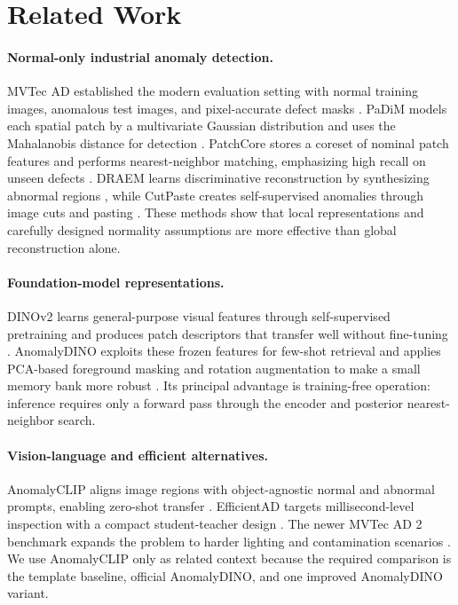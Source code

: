 \section{Related Work}

\paragraph{Normal-only industrial anomaly detection.}
MVTec AD established the modern evaluation setting with normal training
images, anomalous test images, and pixel-accurate defect masks
\cite{bergmann2019mvtec}. PaDiM models each spatial patch by a multivariate
Gaussian distribution and uses the Mahalanobis distance for detection
\cite{defard2021padim}. PatchCore stores a coreset of nominal patch features and
performs nearest-neighbor matching, emphasizing high recall on unseen defects
\cite{roth2022patchcore}. DRAEM learns discriminative reconstruction by
synthesizing abnormal regions \cite{zavrtanik2021draem}, while CutPaste creates
self-supervised anomalies through image cuts and pasting
\cite{li2021cutpaste}. These methods show that local representations and
carefully designed normality assumptions are more effective than global
reconstruction alone.

\paragraph{Foundation-model representations.}
DINOv2 learns general-purpose visual features through self-supervised
pretraining and produces patch descriptors that transfer well without
fine-tuning \cite{oquab2024dinov2}. AnomalyDINO exploits these frozen features
for few-shot retrieval and applies PCA-based foreground masking and rotation
augmentation to make a small memory bank more robust
\cite{damm2025anomalydino}. Its principal advantage is training-free operation:
inference requires only a forward pass through the encoder and posterior
nearest-neighbor search.

\paragraph{Vision-language and efficient alternatives.}
AnomalyCLIP aligns image regions with object-agnostic normal and abnormal
prompts, enabling zero-shot transfer \cite{zhou2024anomalyclip}. EfficientAD
targets millisecond-level inspection with a compact student-teacher design
\cite{batzner2024efficientad}. The newer MVTec AD 2 benchmark expands the
problem to harder lighting and contamination scenarios
\cite{heckler2026mvtec2}. We use AnomalyCLIP only as related context because the
required comparison is the template baseline, official AnomalyDINO, and one
improved AnomalyDINO variant.

